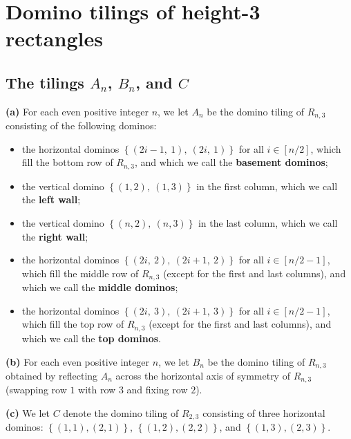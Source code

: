 \section{Domino tilings of height-3 rectangles}

\subsection{The tilings $A_n$, $B_n$, and $C$}

\begin{definition}
\label{def.gf.weighted-set.domino.Rn3.ABC}
\leantarget
\leanok
\textbf{(a)} For each even positive
integer $n$, we let $A_{n}$ be the domino tiling of $R_{n,3}$
consisting of the following dominos:

\begin{itemize}
\item the horizontal dominos $\left\{  \left(  2i-1,\ 1\right)  ,\ \left(
2i,\ 1\right)  \right\}  $ for all $i\in\left[  n/2\right]  $, which fill the
bottom row of $R_{n,3}$, and which we call the \textbf{basement dominos};

\item the vertical domino $\left\{  \left(  1,2\right)  ,\ \left(  1,3\right)
\right\}  $ in the first column, which we call the \textbf{left wall};

\item the vertical domino $\left\{  \left(  n,2\right)  ,\ \left(  n,3\right)
\right\}  $ in the last column, which we call the \textbf{right wall};

\item the horizontal dominos $\left\{  \left(  2i,\ 2\right)  ,\ \left(
2i+1,\ 2\right)  \right\}  $ for all $i\in\left[  n/2-1\right]  $, which fill
the middle row of $R_{n,3}$ (except for the first and last columns), and which
we call the \textbf{middle dominos};

\item the horizontal dominos $\left\{  \left(  2i,\ 3\right)  ,\ \left(
2i+1,\ 3\right)  \right\}  $ for all $i\in\left[  n/2-1\right]  $, which fill
the top row of $R_{n,3}$ (except for the first and last columns), and which we
call the \textbf{top dominos}.
\end{itemize}

\textbf{(b)} For each even positive integer $n$, we let $B_{n}$ be the domino
tiling of $R_{n,3}$ obtained by reflecting $A_{n}$ across the horizontal axis of
symmetry of $R_{n,3}$ (swapping row $1$ with row $3$ and fixing row $2$). \medskip

\textbf{(c)} We let $C$ denote the domino tiling of $R_{2,3}$ consisting of
three horizontal dominos:
$\left\{(1,1),(2,1)\right\}$,
$\left\{(1,2),(2,2)\right\}$, and
$\left\{(1,3),(2,3)\right\}$.
\end{definition}

